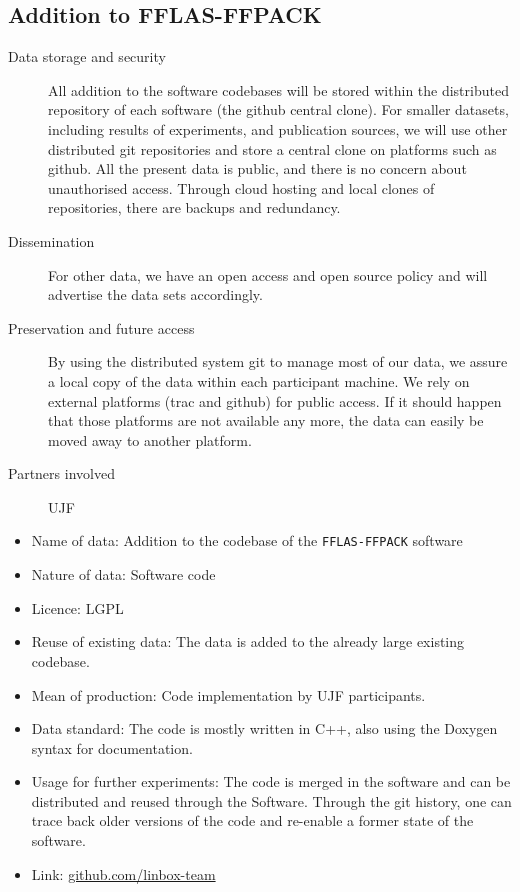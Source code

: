 \documentclass[12pt]{article}
\begin{document}
\begin{enumerate}
\subsection{Addition to FFLAS-FFPACK}

\begin{description}
\item[Data storage and security] All addition to the software codebases will be stored within the distributed repository of each software (the github central
  clone). For smaller datasets, including results of experiments, and publication sources, we will use other distributed git repositories and store a central clone on platforms such as github. All the present data is public, and there is no concern about unauthorised access. Through cloud hosting and local clones of
repositories, there are backups and redundancy.
\item[Dissemination] For other data, we have an open access and open source policy and will advertise the data sets accordingly.
\item[Preservation and future access] By using the distributed system git to manage most of our data, we assure a local copy of the data within each participant machine. We rely on external platforms (trac and github) for public access. If it should happen that those platforms are not available any more, the data can easily be moved away to another platform.
\item[Partners involved] UJF
\end{description}

\begin{itemize}
\item{Name of data:} Addition to the codebase of the \texttt{FFLAS-FFPACK} software
\item{Nature of data:} Software code
\item{Licence:} LGPL
\item{Reuse of existing data:} The data is added to the already large existing codebase.
\item{Mean of production:} Code implementation by UJF participants.
\item{Data standard:} The code is mostly written in C++, also using the Doxygen syntax for documentation.
\item{Usage for further experiments:} The code is merged in the software and can be distributed and reused through the Software. Through the git history,
one can trace back older versions of the code and re-enable a former state of the software.
\item{Link:} \href{https://github.com/linbox-team}{github.com/linbox-team}
\end{itemize}

\end{enumerate}
\end{document}
